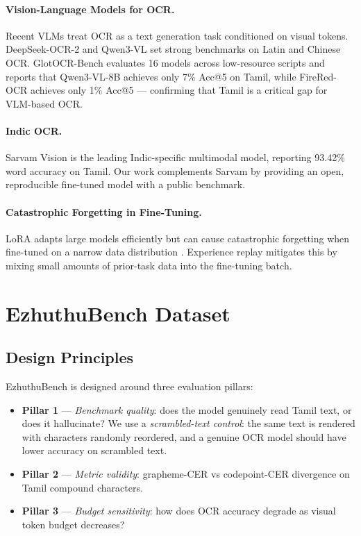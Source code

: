 \documentclass[11pt,a4paper]{article}
\begin{document}
\paragraph{Vision-Language Models for OCR.}
Recent VLMs treat OCR as a text generation task conditioned on visual tokens.
DeepSeek-OCR-2 \citep{deepseek2025} and Qwen3-VL \citep{qwen3vl2025} set
strong benchmarks on Latin and Chinese OCR.
GlotOCR-Bench \citep{glotocr2026} evaluates 16 models across low-resource
scripts and reports that Qwen3-VL-8B achieves only 7\% Acc@5 on Tamil,
while FireRed-OCR achieves only 1\% Acc@5 --- confirming that Tamil is a
critical gap for VLM-based OCR.

\paragraph{Indic OCR.}
Sarvam Vision \citep{sarvam2026} is the leading Indic-specific multimodal
model, reporting 93.42\% word accuracy on Tamil.
Our work complements Sarvam by providing an open, reproducible fine-tuned
model with a public benchmark.

\paragraph{Catastrophic Forgetting in Fine-Tuning.}
LoRA \citep{hu2022lora} adapts large models efficiently but can cause
catastrophic forgetting when fine-tuned on a narrow data distribution
\citep{kirkpatrick2017ewc}.
Experience replay \citep{rolnick2019replay} mitigates this by mixing
small amounts of prior-task data into the fine-tuning batch.

\section{EzhuthuBench Dataset}
\label{sec:dataset}

\subsection{Design Principles}

EzhuthuBench is designed around three evaluation pillars:

\begin{itemize}
  \item \textbf{Pillar 1} --- \emph{Benchmark quality}: does the model
        genuinely read Tamil text, or does it hallucinate?
        We use a \emph{scrambled-text control}: the same text is rendered
        with characters randomly reordered, and a genuine OCR model should
        have lower accuracy on scrambled text.
  \item \textbf{Pillar 2} --- \emph{Metric validity}: grapheme-CER vs
        codepoint-CER divergence on Tamil compound characters.
  \item \textbf{Pillar 3} --- \emph{Budget sensitivity}: how does OCR
        accuracy degrade as visual token budget decreases?
\end{itemize}
\end{document}
